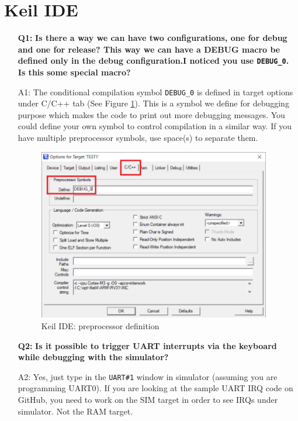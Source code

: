 \section{Keil IDE}
\label{sec_keil_ide}
\begin{itemize}
\item[{\bf Q1:}] {\bf Is there a way we can have two configurations, one for debug and one for release? This way we can have a DEBUG macro be defined only in the debug configuration.I noticed you use \verb+DEBUG_0+. Is this some special macro?}

\item[A1:]
The conditional compilation symbol \verb+DEBUG_0+ is defined in target options under C/C++ tab (See Figure \ref{fig_keil_ide_preprocessor}). This is a symbol we define for debugging purpose which makes the code to print out more debugging messages. You could define your own symbol to control compilation in a similar way. If you have multiple preprocessor symbols, use space(s) to separate them.
\begin{figure}[ht]
\centerline{\includegraphics[width=4in]{figure/Keil_IDE_Preprocessor}}
\caption{Keil IDE: preprocessor definition} 
\label{fig_keil_ide_preprocessor}
\end{figure}


\item[{\bf Q2:}] {\bf Is it possible to trigger UART interrupts via the keyboard while debugging with the simulator? }
\item[A2:]
Yes, just type in the \verb+UART#1+ window in simulator (assuming you are programming UART0).  
If you are looking at the sample UART IRQ code on GitHub, you need to work on the SIM target in order to see IRQs under simulator. Not the RAM target.

\end{itemize}

